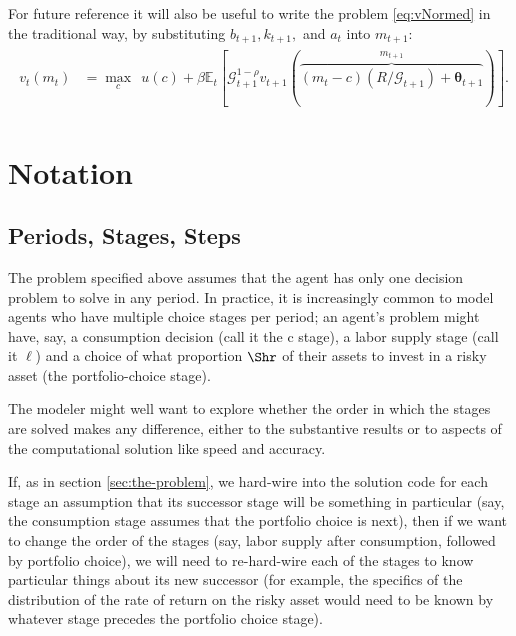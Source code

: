\documentclass[titlepage, headings=optiontotocandhead]{Resources/texmf-local/tex/latex/econtex}
\begin{document}
For future reference it will also be useful to write the problem \eqref{eq:vNormed} in the traditional way, by substituting $b_{t+1},{k}_{t+1},$ and $a_{t}$ into $m_{t+1}$:
\begin{equation}\begin{gathered}\begin{aligned}
      v_{t}(m_{t}) & = \max_{c} ~~ u(c)+ \beta {\mathbb{E}}_{t}[ \mathcal{G}_{t+1}^{1-\rho}v_{t+1}(\overbrace{(m_{t}-c)(R/\mathcal{G}_{t+1})+\pmb{\theta}_{t+1}}^{m_{t+1}})] \label{eq:vusual}.
    \end{aligned}\end{gathered}\end{equation}



\hypertarget{notation}{}
\section{Notation}\label{sec:notation}

\subsection{Periods, Stages, Steps}

The problem specified above assumes that the agent has only one decision problem to solve in any {period}.  In practice, it is increasingly common to model agents who have multiple choice {stage}s per {period}; an agent's problem might have, say, a consumption decision (call it the $\mathrm{c}$ {stage}), a labor supply {stage} (call it $\ell$) and a choice of what proportion $\Shr$ of their assets to invest in a risky asset (the portfolio-choice {stage}).

The modeler might well want to explore whether the order in which the {stage}s are solved makes any difference, either to the substantive results or to aspects of the computational solution like speed and accuracy.

If, as in section \ref{sec:the-problem}, we hard-wire into the solution code for each {stage} an assumption that its successor {stage} will be something in particular (say, the consumption {stage} assumes that the portfolio choice is next), then if we want to change the order of the {stage}s (say, labor supply after consumption, followed by portfolio choice), we will need to re-hard-wire each of the stages to know particular things about its new successor (for example, the specifics of the distribution of the rate of return on the risky asset would need to be known by whatever {stage} precedes the portfolio choice {stage}).
\end{document}
